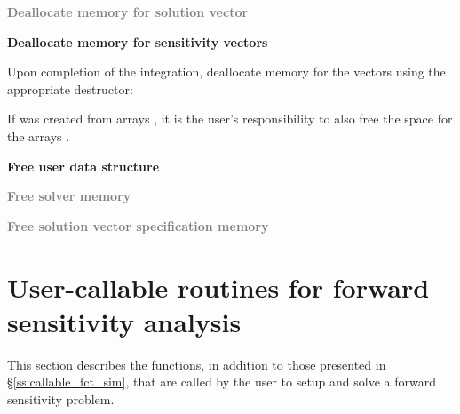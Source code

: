 \begin{Steps}
\item
  \textcolor{gray}{\bf Deallocate memory for solution vector}

\item 
  {\bf Deallocate memory for sensitivity vectors}

  Upon completion of the integration, deallocate memory for the vectors 
  using the appropriate destructor:


  If  was created from  arrays , it is the
  user's responsibility to also free the space for the arrays .

\item
  {\bf Free user data structure}

\item
  \textcolor{gray}{\bf Free solver memory}
  
\item
  \textcolor{gray}{\bf Free solution vector specification memory}

\end{Steps}

\section{User-callable routines for forward sensitivity analysis}

This section describes the {\cvodes} functions, in addition to those presented
in \S\ref{ss:callable_fct_sim}, that are called by the user to setup and solve
a forward sensitivity problem.

